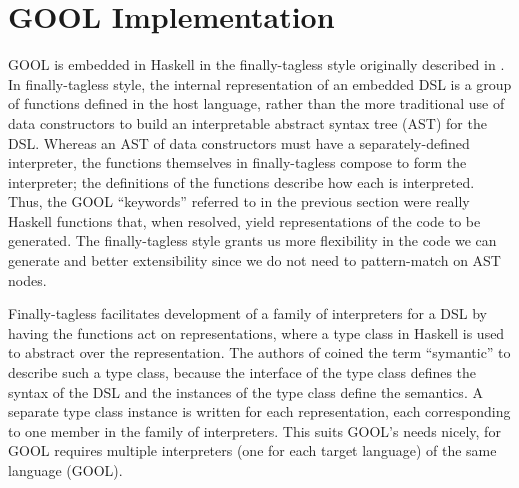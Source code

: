 \documentclass[sigplan,review,anonymous,prologue,dvipsnames]{acmart}
\begin{document}
\section{GOOL Implementation} \label{sec:implementation}

GOOL is embedded in Haskell in the finally-tagless style originally described 
in \cite{carette2009finally}. In finally-tagless style, the internal 
representation of an embedded DSL is a group of functions defined in the host 
language, rather than the more traditional use of data constructors to build an 
interpretable abstract syntax tree (AST) for the DSL. Whereas an AST of data 
constructors must have a separately-defined interpreter, the functions 
themselves in finally-tagless compose to form the interpreter; the definitions 
of the functions describe how each is interpreted. Thus, the GOOL ``keywords'' 
referred to in the previous section were really Haskell functions that, when 
resolved, yield representations of the code to be generated. The 
finally-tagless style grants us more flexibility in the code we can generate 
and better extensibility since we do not need to pattern-match on AST nodes.

Finally-tagless facilitates development of a family of interpreters for a DSL 
by having the functions act on representations, where a type class in Haskell 
is used to abstract over the representation. The authors of 
\cite{carette2009finally} coined the term ``symantic'' to describe such a type 
class, because the interface of the type class defines the syntax of the DSL 
and the instances of the type class define the semantics. A separate type class 
instance is written for each representation, each corresponding to one member 
in the family of interpreters. This suits GOOL's needs nicely, for GOOL 
requires multiple interpreters (one for each target language) of the same 
language (GOOL).
\end{document}
